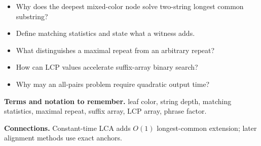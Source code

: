 \documentclass[11pt]{article}
\begin{document}
\begin{tcolorbox}[enhanced,breakable,title={Self-test questions},
  colback=white,colframe=Accent,fonttitle=\small\sffamily\bfseries,fontupper=\footnotesize,
  boxsep=0.6mm,left=1.5mm,right=1.5mm,top=1mm,bottom=1mm,before skip=3pt,after skip=3pt]
\begin{itemize}
  \item Why does the deepest mixed-color node solve two-string longest common substring?
  \item Define matching statistics and state what a witness adds.
  \item What distinguishes a maximal repeat from an arbitrary repeat?
  \item How can LCP values accelerate suffix-array binary search?
  \item Why may an all-pairs problem require quadratic output time?
\end{itemize}
\end{tcolorbox}

{\footnotesize
\textbf{Terms and notation to remember.} leaf color, string depth, matching statistics, maximal repeat, suffix array, LCP array, phrase factor.

\textbf{Connections.} Constant-time LCA adds $O(1)$ longest-common extension; later alignment methods use exact anchors.
}
\end{document}
